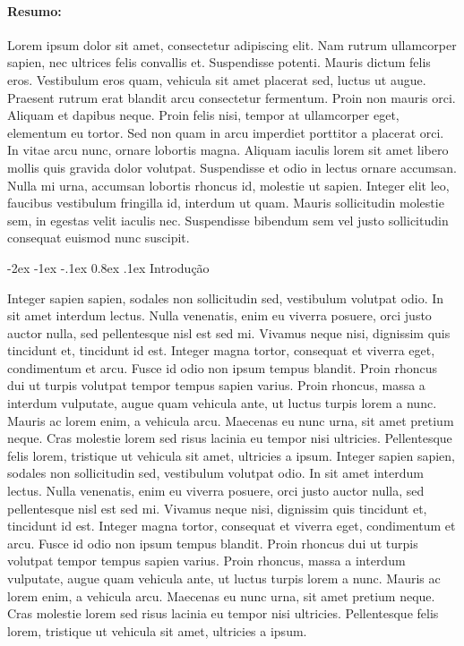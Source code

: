 \documentclass[plainsections,  36pt]{sciposter}
\makeatletter
\newcommand{\largo}{\fontsize{36}{40}\selectfont }
\renewcommand\section{\@startsection {section}{1}{\z@}%
                                   {-2ex \@plus -1ex \@minus -.1ex}%
                                   {0.8ex \@plus.1ex}%
                                   {\normalfont\largo\bfseries}}
\makeatother
\begin{document}
\vspace{1.2cm}
\begin{multicols}{2}
\paragraph{Resumo:}

Lorem ipsum dolor sit amet, consectetur adipiscing elit. Nam rutrum ullamcorper sapien, nec ultrices felis convallis et. Suspendisse potenti. Mauris dictum felis eros. Vestibulum eros quam, vehicula sit amet placerat sed, luctus ut augue. Praesent rutrum erat blandit arcu consectetur fermentum. Proin non mauris orci. Aliquam et dapibus neque. Proin felis nisi, tempor at ullamcorper eget, elementum eu tortor. Sed non quam in arcu imperdiet porttitor a placerat orci. In vitae arcu nunc, ornare lobortis magna. Aliquam iaculis lorem sit amet libero mollis quis gravida dolor volutpat. Suspendisse et odio in lectus ornare accumsan. Nulla mi urna, accumsan lobortis rhoncus id, molestie ut sapien. Integer elit leo, faucibus vestibulum fringilla id, interdum ut quam. Mauris sollicitudin molestie sem, in egestas velit iaculis nec. Suspendisse bibendum sem vel justo sollicitudin consequat euismod nunc suscipit.

 \section{Introdução}

Integer sapien sapien, sodales non sollicitudin sed, vestibulum volutpat odio. In sit amet interdum lectus.
Nulla venenatis, enim eu viverra posuere, orci justo auctor nulla, sed pellentesque nisl est sed mi.
Vivamus neque nisi, dignissim quis tincidunt et, tincidunt id est. Integer magna tortor, consequat et viverra eget,
condimentum et arcu. Fusce id odio non ipsum tempus blandit. Proin rhoncus dui ut turpis volutpat tempor tempus sapien varius. 
Proin rhoncus, massa a interdum vulputate, augue quam vehicula ante, ut luctus turpis lorem a nunc.
Mauris ac lorem enim, a vehicula arcu. Maecenas eu nunc urna, sit amet pretium neque.
Cras molestie lorem sed risus lacinia eu tempor nisi ultricies.
Pellentesque felis lorem, tristique ut vehicula sit amet, ultricies a ipsum.
Integer sapien sapien, sodales non sollicitudin sed, vestibulum volutpat odio. In sit amet interdum lectus.
Nulla venenatis, enim eu viverra posuere, orci justo auctor nulla, sed pellentesque nisl est sed mi.
Vivamus neque nisi, dignissim quis tincidunt et, tincidunt id est. Integer magna tortor, consequat et viverra eget,
condimentum et arcu. Fusce id odio non ipsum tempus blandit. Proin rhoncus dui ut turpis volutpat tempor tempus sapien varius. 
Proin rhoncus, massa a interdum vulputate, augue quam vehicula ante, ut luctus turpis lorem a nunc.
Mauris ac lorem enim, a vehicula arcu. Maecenas eu nunc urna, sit amet pretium neque.
Cras molestie lorem sed risus lacinia eu tempor nisi ultricies.
Pellentesque felis lorem, tristique ut vehicula sit amet, ultricies a ipsum.

\end{multicols}
\end{document}

